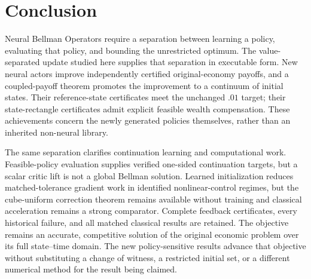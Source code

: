 \section{Conclusion}\label{sec:conclusion}
Neural Bellman Operators require a separation between learning a policy, evaluating that policy, and bounding the unrestricted optimum. The value-separated update studied here supplies that separation in executable form. New neural actors improve independently certified original-economy payoffs, and a coupled-payoff theorem promotes the improvement to a continuum of initial states. Their reference-state certificates meet the unchanged $.01$ target; their state-rectangle certificates admit explicit feasible wealth compensation. These achievements concern the newly generated policies themselves, rather than an inherited non-neural library.

The same separation clarifies continuation learning and computational work. Feasible-policy evaluation supplies verified one-sided continuation targets, but a scalar critic lift is not a global Bellman solution. Learned initialization reduces matched-tolerance gradient work in identified nonlinear-control regimes, but the cube-uniform correction theorem remains available without training and classical acceleration remains a strong comparator. Complete feedback certificates, every historical failure, and all matched classical results are retained. The objective remains an accurate, competitive solution of the original economic problem over its full state--time domain. The new policy-sensitive results advance that objective without substituting a change of witness, a restricted initial set, or a different numerical method for the result being claimed.
